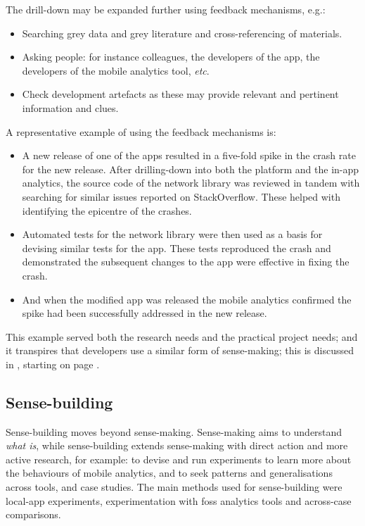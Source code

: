 The drill-down may be expanded further using feedback mechanisms, e.g.:
 
\begin{itemize}
\itemsep0em
\item Searching grey data and grey literature and cross-referencing of materials.
    \item Asking people: for instance colleagues, the developers of the app, the developers of the mobile analytics tool, \textit{etc}.
    \item Check development artefacts as these may provide relevant and pertinent information and clues.
\end{itemize}

A representative example of using the feedback mechanisms is:

\begin{itemize}
    \item A new release of one of the apps resulted in a five-fold spike in the crash rate for the new release. After drilling-down into both the platform and the in-app analytics, the source code of the network library was reviewed in tandem with searching for similar issues reported on StackOverflow. These helped with identifying the epicentre of the crashes.
    \item Automated tests for the network library were then used as a basis for devising similar tests for the app. These tests reproduced the crash and demonstrated the subsequent changes to the app were effective in fixing the crash.
    \item And when the modified app was released the mobile analytics confirmed the spike had been successfully addressed in the new release.
\end{itemize}

This example served both the research needs and the practical project needs; and it transpires that developers use a similar form of sense-making; this is discussed in , starting on page \pageref{aiu-sensemaking-and-decision-taking-by-developers-section}.

\subsection{Sense-building}
Sense-building moves beyond sense-making. Sense-making aims to understand \textit{what is}, while sense-building extends sense-making with direct action and more active research, for example: to devise and run experiments to learn more about the behaviours of mobile analytics, and to seek patterns and generalisations across tools, and case studies. The main methods used for sense-building were local-app experiments, experimentation with \Gls{foss} analytics tools and across-case comparisons. 

